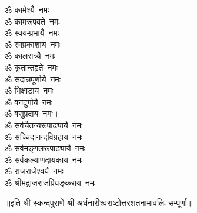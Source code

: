 \begin{multicols}{2}
\begin{flushleft}
ॐ कामेश्यै~नमः\\
ॐ कामरूपवते~नमः\\
ॐ स्वयम्प्रभायै~नमः\\
ॐ स्वप्रकाशाय~नमः\\
ॐ कालरात्र्यै~नमः\\
ॐ कृतान्तहृते~नमः\\
ॐ सदान्नपूर्णायै~नमः\\
ॐ भिक्षाटाय~नमः\\
ॐ वनदुर्गायै~नमः\\
ॐ वसुप्रदाय~नमः।\hfill{}\\
ॐ सर्वचैतन्यरूपाढ्यायै~नमः\\
ॐ सच्चिदानन्दविग्रहाय~नमः\\
ॐ सर्वमङ्गलरूपाढ्यायै~नमः\\
ॐ सर्वकल्याणदायकाय~नमः\\
ॐ राजराजेश्वर्यै~नमः\\
ॐ श्रीमद्राजराजप्रियङ्कराय~नमः\\
\end{flushleft}
\end{multicols}
॥इति श्री स्कन्दपुराणे श्री अर्धनारीश्वराष्टोत्तरशतनामावलिः सम्पूर्णा॥
